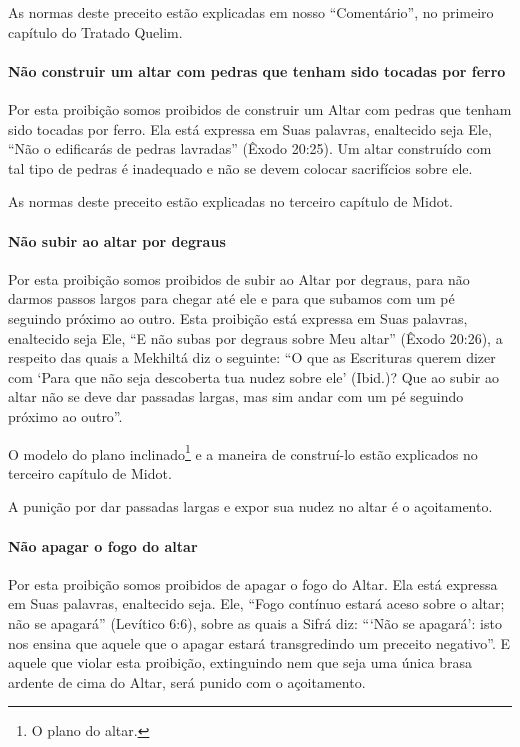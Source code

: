 As normas deste preceito estão explicadas em nosso ``Comentário'', no
primeiro capítulo do Tratado Quelim.

\paragraph{Não construir um altar com pedras que tenham sido tocadas por ferro}

Por esta proibição somos proibidos de construir um Altar com pedras que
tenham sido tocadas por ferro. Ela está expressa em Suas palavras,
enaltecido seja Ele, ``Não o edificarás de pedras lavradas'' (Êxodo
20:25). Um altar construído com tal tipo de pedras é inadequado e não se
devem colocar sacrifícios sobre ele.

As normas deste preceito estão explicadas no terceiro capítulo de Midot.

\paragraph{Não subir ao altar por degraus}

Por esta proibição somos proibidos de subir ao Altar por degraus, para
não darmos passos largos para chegar até ele e para que subamos com um
pé seguindo próximo ao outro. Esta proibição está expressa em Suas
palavras, enaltecido seja Ele, ``E não subas por degraus sobre Meu
altar'' (Êxodo 20:26), a respeito das quais a Mekhiltá diz o seguinte: ``O que as Escrituras querem dizer com `Para que não seja descoberta tua nudez sobre ele'
(Ibid.)? Que ao subir ao altar não se deve dar passadas largas, mas sim
andar com um pé seguindo próximo ao outro''.

O modelo do plano inclinado\footnote{O plano do altar.} e a maneira de
construí-lo estão explicados no terceiro capítulo de Midot.

A punição por dar passadas largas e expor sua nudez no altar é o
açoitamento.

\paragraph{Não apagar o fogo do altar}

Por esta proibição somos proibidos de apagar o fogo do Altar. Ela está
expressa em Suas palavras, enaltecido seja. Ele, ``Fogo contínuo estará
aceso sobre o altar; não se apagará'' (Levítico 6:6), sobre as quais a
Sifrá diz: ```Não se apagará': isto nos ensina que aquele que o apagar
estará transgredindo um preceito negativo''. E aquele que violar esta
proibição, extinguindo nem que seja uma única brasa ardente de cima do
Altar, será punido com o açoitamento.

